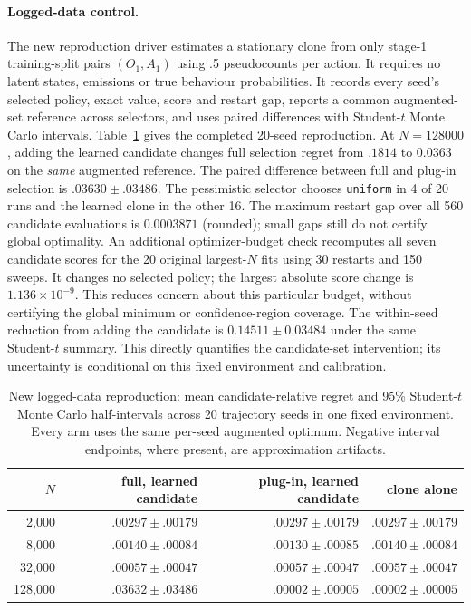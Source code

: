 \documentclass[11pt]{article}
\newcommand{\LearnedPessAtLarge}{0.0363}
\newcommand{\CandidateGainAtLarge}{0.14511}
\newcommand{\CandidateGainHalfInterval}{0.03484}
\newcommand{\MaximumRestartGap}{0.0003871}
\begin{document}
\paragraph{Logged-data control.}
The new reproduction driver estimates a stationary clone from only stage-1
training-split pairs $(O_1,A_1)$ using .5 pseudocounts per action. It requires no
latent states, emissions or true behaviour probabilities. It records every
seed's selected policy, exact value, score and restart gap, reports a common
augmented-set reference across selectors, and uses paired differences with
Student-$t$ Monte Carlo intervals. Table~\ref{tab:learned} gives the completed
20-seed reproduction. At $N=128000$, adding the learned candidate changes full
selection regret from $.1814$ to $\LearnedPessAtLarge$ on the \emph{same}
augmented reference. The paired difference between full and plug-in selection
is $.03630\pm.03486$. The pessimistic selector chooses \texttt{uniform} in
4 of 20 runs and the learned clone in the other 16. The maximum restart
gap over all 560 candidate evaluations is $\MaximumRestartGap$ (rounded);
small gaps still do not
certify global optimality.
An additional optimizer-budget check recomputes all seven candidate scores
for the 20 original largest-$N$ fits using 30 restarts and 150 sweeps.
It changes no selected policy; the largest absolute score change is
$1.136\times10^{-9}$. This reduces concern about this particular budget,
without certifying the global minimum or confidence-region coverage.
The within-seed reduction from adding the candidate is
$\CandidateGainAtLarge\pm\CandidateGainHalfInterval$ under the same
Student-$t$ summary. This directly quantifies the candidate-set intervention;
its uncertainty is conditional on this fixed environment and calibration.

\begin{table}[t]
\centering\small
\caption{New logged-data reproduction: mean candidate-relative regret and
95\% Student-$t$ Monte Carlo half-intervals across 20 trajectory seeds in one
fixed environment. Every arm uses the same per-seed augmented optimum.
Negative interval endpoints, where present, are approximation artifacts.}
\begin{tabular}{rrrr}\toprule
$N$ & full, learned candidate & plug-in, learned candidate & clone alone\\\midrule
2,000 & $.00297\pm.00179$ & $.00297\pm.00179$ & $.00297\pm.00179$\\
8,000 & $.00140\pm.00084$ & $.00130\pm.00085$ & $.00140\pm.00084$\\
32,000 & $.00057\pm.00047$ & $.00057\pm.00047$ & $.00057\pm.00047$\\
128,000 & $.03632\pm.03486$ & $.00002\pm.00005$ & $.00002\pm.00005$\\\bottomrule
\end{tabular}\label{tab:learned}
\end{table}
\end{document}
